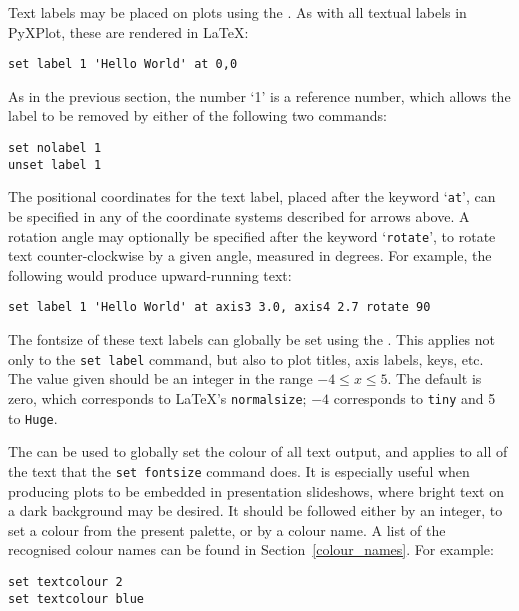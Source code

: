 Text labels may be placed on plots using the . As with all
textual labels in PyXPlot, these are rendered in \LaTeX:

\begin{verbatim}
set label 1 'Hello World' at 0,0
\end{verbatim}

As in the previous section, the number `1' is a reference number, which allows
the label to be removed by either of the following two commands:

\begin{verbatim}
set nolabel 1
unset label 1
\end{verbatim}

\noindent The positional coordinates for the text label, placed after the
keyword `{\tt at}', can be specified in any of the coordinate systems
described for arrows above. A rotation angle may optionally be specified after
the keyword `{\tt rotate}', to rotate text counter-clockwise by a given
angle, measured in degrees. For example, the following would produce
upward-running text:

\begin{verbatim}
set label 1 'Hello World' at axis3 3.0, axis4 2.7 rotate 90
\end{verbatim}

 The fontsize of these text labels can
globally be set using the . This applies not only to the
{\tt set label} command, but also to plot titles, axis labels, keys, etc. The
value given should be an integer in the range $-4 \leq x \leq 5$. The default
is zero, which corresponds to \LaTeX's {\tt normalsize}; $-4$ corresponds to
{\tt tiny} and 5 to {\tt Huge}.

 The  can be
used to globally set the colour of all text output, and applies to all of the
text that the {\tt set fontsize} command does. It is especially useful when
producing plots to be embedded in presentation slideshows, where bright text on
a dark background may be desired. It should be followed either by an integer,
to set a colour from the present palette, or by a colour name. A list of the
recognised colour names can be found in Section~\ref{colour_names}.  For
example:

\begin{verbatim}
set textcolour 2
set textcolour blue
\end{verbatim}

